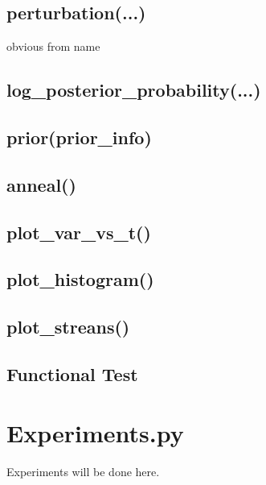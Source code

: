 \documentclass{article}
\begin{document}
\subsection{perturbation(...)}
obvious from name
\subsection{log\_posterior\_probability(...)}
\subsection{prior(prior\_info)}
\subsection{anneal()}
\subsection{plot\_var\_vs\_t()}
\subsection{plot\_histogram()}
\subsection{plot\_streans()}
\subsection{Functional Test}

\section{Experiments.py}
Experiments will be done here.
\end{document}
